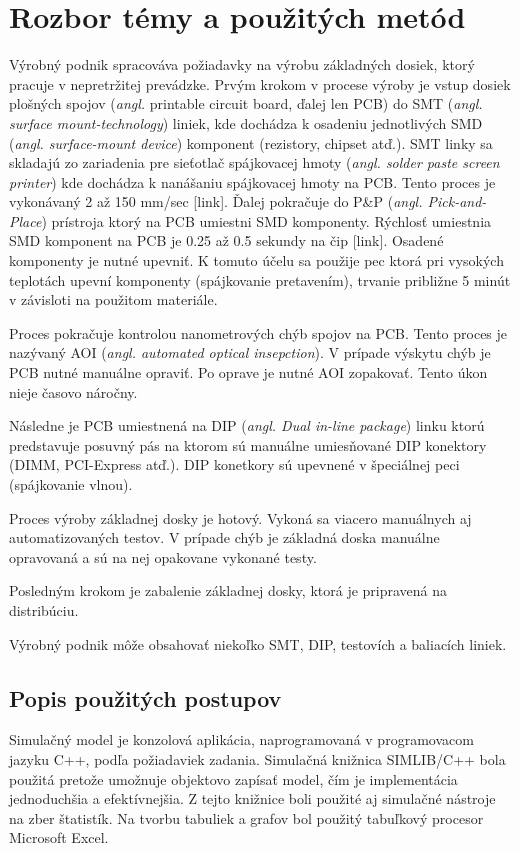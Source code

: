 \documentclass[12pt,a4paper,titlepage,final]{article}
\begin{document}
\section{Rozbor témy a použitých metód}
Výrobný podnik spracováva požiadavky na výrobu základných dosiek, ktorý pracuje
v nepretržitej prevádzke. Prvým krokom v procese výroby je vstup dosiek plošných
spojov (\textit{angl.} printable circuit board, ďalej len PCB) do SMT
(\textit{angl. surface mount-technology}) liniek, kde dochádza k osadeniu jednotlivých
SMD (\textit{angl. surface-mount device}) komponent (rezistory, chipset atď.).
SMT linky sa skladajú zo zariadenia pre sieťotlač spájkovacej 
hmoty (\textit{angl. solder paste screen printer}) kde dochádza k nanášaniu spájkovacej
hmoty na PCB. Tento proces je vykonávaný 2 až 150 mm/sec [link]. Ďalej pokračuje
do P\&P (\textit{angl. Pick-and-Place}) prístroja ktorý na PCB umiestni 
SMD komponenty. Rýchlosť umiestnia SMD komponent na PCB je 0.25 až 0.5 sekundy
na čip [link]. Osadené komponenty je nutné upevniť. K tomuto účelu sa použije
pec ktorá pri vysokých teplotách upevní komponenty (spájkovanie pretavením), 
trvanie približne 5 minút v závisloti na použitom materiále. 

Proces pokračuje kontrolou nanometrových chýb spojov na PCB. Tento proces je 
nazývaný AOI (\textit{angl. automated optical insepction}). V prípade výskytu
chýb je PCB nutné manuálne opraviť. Po oprave je nutné AOI zopakovať. Tento
úkon nieje časovo náročny.

Následne je PCB umiestnená na DIP (\textit{angl. Dual in-line package})
linku ktorú predstavuje posuvný pás na ktorom sú manuálne umiesňované 
DIP konektory (DIMM, PCI-Express atď.). DIP konetkory sú upevnené v špeciálnej
peci (spájkovanie vlnou).

Proces výroby základnej dosky je hotový. Vykoná sa viacero manuálnych aj automatizovaných
testov. V prípade chýb je základná doska manuálne opravovaná a sú na nej opakovane vykonané
testy.

Posledným krokom je zabalenie základnej dosky, ktorá je pripravená na distribúciu.

Výrobný podnik môže obsahovať niekoľko SMT, DIP, testovích a baliacích liniek.

\subsection{Popis použitých postupov}
Simulačný model je konzolová aplikácia, naprogramovaná v programovacom jazyku
C++, podľa požiadaviek zadania. Simulačná knižnica SIMLIB/C++ bola použitá pretože
umožnuje objektovo zapísať model, čím je implementácia jednoduchšia a efektívnejšia.
Z tejto knižnice boli použité aj simulačné nástroje na zber štatistík. Na tvorbu
tabuliek a grafov bol použitý tabuľkový procesor Microsoft Excel.
\end{document}
